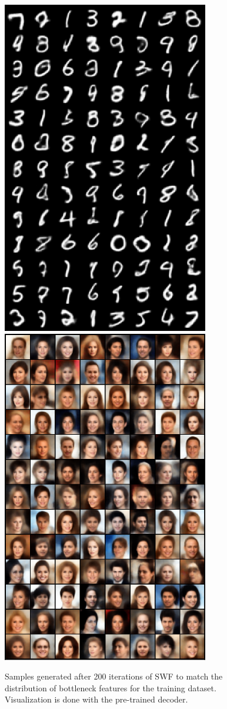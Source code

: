 \begin{figure}[h]
\centering
\includegraphics[width=0.49\columnwidth]{figures/MNIST_train_image_500.pdf}
\includegraphics[width=0.49\columnwidth]{figures/CelebA_train_image_500.pdf}
\vspace{-\baselineskip}
\caption{Samples generated after 200 iterations of SWF to match the distribution of bottleneck features for the training dataset. Visualization is done with the pre-trained decoder.\label{fig:samples}}
\vspace{-\baselineskip}
\end{figure}

